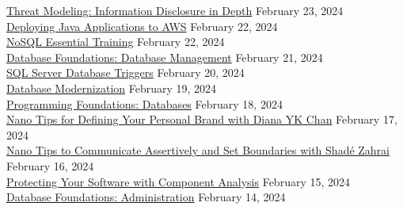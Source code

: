 \documentclass[10pt]{res} %
\begin{document}
\begin{resume}
\href{https://www.linkedin.com/learning/certificates/a6504760060c732911be361a2923d3941e76f3e33098e54c611b0895934e990c}{\color{blue}Threat Modeling: Information Disclosure in Depth} \hfill February 23, 2024 \\
\href{https://www.linkedin.com/learning/certificates/a8e6c5f361dee9b81f2f87d6fa59d715b7d3708dc9f47b9c305a0afdc78d7782}{\color{blue}Deploying Java Applications to AWS} \hfill February 22, 2024 \\
\href{https://www.linkedin.com/learning/certificates/cff2d6ba6d1a6ebc0fe7e943a1a7bedf6a759dd575de1f67d6f70581191ae1dd}{\color{blue}NoSQL Essential Training} \hfill February 22, 2024 \\
\href{https://www.linkedin.com/learning/certificates/376bb6733ac4c4ca259a32a5c4dd2f650ff7e763d7c6976e1e7154ea63926b53}{\color{blue}Database Foundations: Database Management} \hfill February 21, 2024 \\
\href{https://www.linkedin.com/learning/certificates/d3f06266505e918db84841451f844d8b559881a17ac71e0fb189948bcf66b0a6}{\color{blue}SQL Server Database Triggers} \hfill February 20, 2024 \\
\href{https://www.linkedin.com/learning/certificates/837f06bf42a9bc1180e103c6729b82b4c805078ba82265d85714120ccf2df27c}{\color{blue}Database Modernization} \hfill February 19, 2024 \\
\href{https://www.linkedin.com/learning/certificates/5f6005b2f0946e834af6ba99529bdcd3d51f44da1e9d0fee85cf576637e3a79d}{\color{blue}Programming Foundations: Databases} \hfill February 18, 2024 \\
\href{https://www.linkedin.com/learning/certificates/a352be0f55341e0379eb512b0b3727b9e62e64f5e2eb14a0bdde513747753d52}{\color{blue}Nano Tips for Defining Your Personal Brand with Diana YK Chan} \hfill February 17, 2024 \\
\href{https://www.linkedin.com/learning/certificates/7b304ed6b2d11da4326554f524e0af94102ac51ba695dd1196f3213cc63e6a8b}{\color{blue}Nano Tips to Communicate Assertively and Set Boundaries with Shadé Zahrai} \hfill February 16, 2024 \\
\href{https://www.linkedin.com/learning/certificates/2ec81cff356577ce14b5babf6ebbcd8cb21f7b7e7a20eb41e7f41bcbd7e16b1e}{\color{blue}Protecting Your Software with Component Analysis} \hfill February 15, 2024 \\
\href{https://www.linkedin.com/learning/certificates/5ed8216845081e45e7adcd40419e87e5f0a866e6c4b1350dc6faaa27e6566555}{\color{blue}Database Foundations: Administration} \hfill February 14, 2024 \\

\end{resume}
\end{document}
